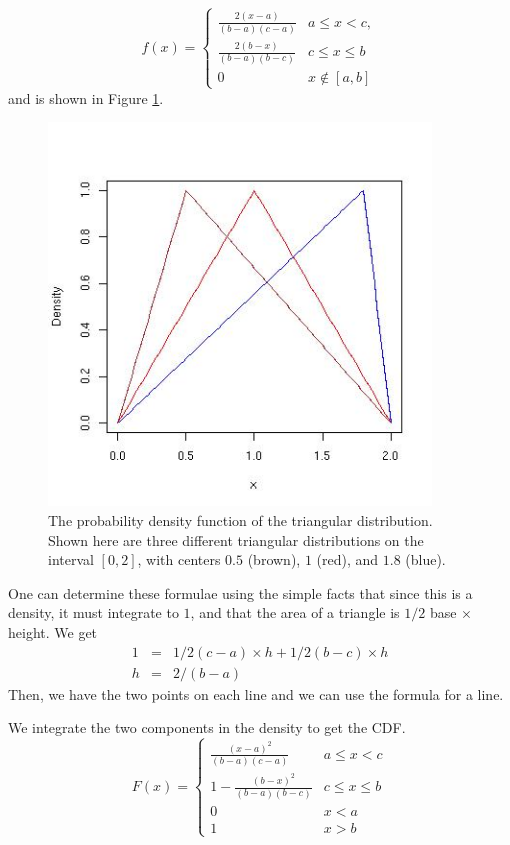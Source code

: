 $$
  f(x) = 
  \begin{cases}%
   \frac{2(x - a)}{(b-a)(c-a)} & a \le x < c, \\
   \frac{2(b -x)}{(b-a)(b-c)} & c \le x \le b \\
   0 & x \not\in [a, b]    
  \end{cases}
$$
and is shown in Figure \ref{fig:triangularDensity}.
\begin{figure}[htbp]
  \begin{center}
    \leavevmode
    \includegraphics[width=4in]{RNG/images/triangularDensity.jpg}
    \caption{The probability density function of the triangular distribution.
   Shown here are three different triangular distributions
   on the  interval $[0, 2]$, with centers 
    $0.5$ (brown), $1$ (red), and $1.8$ (blue).
   }
    \label{fig:triangularDensity}
  \end{center}
\end{figure}
One can determine these formulae using
the simple facts that since this is a density, it 
must integrate to $1$, and that the 
area of a triangle is 
$1/2$ base $\times$ height.  We get
\begin{eqnarray*}
 1 & = & 1/2 (c-a)\times h + 1/2 (b-c) \times h \\
 h &=& 2/(b-a)
\end{eqnarray*}
Then, we have the two points on each line
and we can use the formula for a line.


We integrate the two components
in the density to get the CDF.
$$
  F(x) = 
  \begin{cases}
  \frac{(x - a)^2}{(b-a)(c-a)} & a \le x < c\\
                  1 - \frac{(b -x)^2}{(b-a)(b-c)} & c \le x \le b \\
                  0 & x < a \\
                  1 & x > b
  \end{cases}
$$

